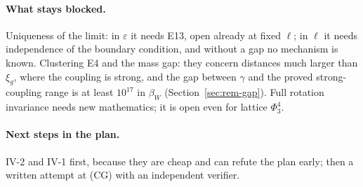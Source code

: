 \paragraph{What stays blocked.} Uniqueness of the limit: in $\varepsilon$ it needs E13, open already at fixed $\ell$; in $\ell$ it needs independence of the boundary condition, and without a gap no mechanism is known. Clustering E4 and the mass gap: they concern distances much larger than $\xi_g$, where the coupling is strong, and the gap between $\gamma$ and the proved strong-coupling range is at least $10^{17}$ in $\beta_W$ (Section~\ref{sec:rem-gap}). Full rotation invariance needs new mathematics; it is open even for lattice $\Phi^4_3$.

\paragraph{Next steps in the plan.} IV-2 and IV-1 first, because they are cheap and can refute the plan early; then a written attempt at (CG) with an independent verifier.

